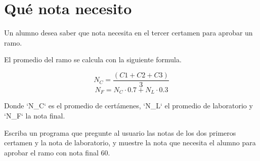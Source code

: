 \section{Qué nota necesito}

Un alumno desea saber que nota necesita en el tercer certamen para
aprobar un ramo.

El promedio del ramo se calcula con la siguiente formula.

\[N_C = \frac{(C1+C2+C3)}{3}\]\[N_F = N_C\cdot 0.7 + N_L\cdot 0.3\]

Donde `N\_C` es el promedio de certámenes, `N\_L` el promedio de
laboratorio y `N\_F` la nota final.

Escriba un programa que pregunte al usuario las notas de los dos
primeros certamen y la nota de laboratorio, y muestre la nota que
necesita el alumno para aprobar el ramo con nota final 60.
